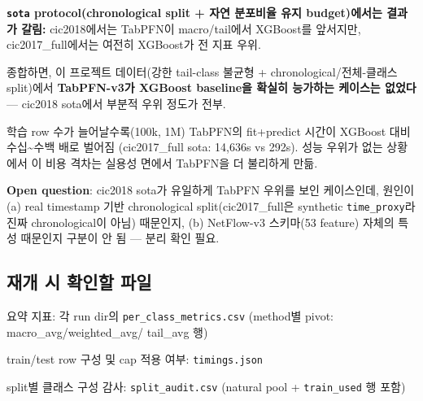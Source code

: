 \par\noindent \textbullet\enspace \textbf{\texttt{sota} protocol(chronological split +\allowbreak{} 자연 분포비율 유지 budget)에서는 결과가 갈림:} cic2018에서는 TabPFN이 macro/\allowbreak{}tail에서 XGBoost를 앞서지만, cic2017\_\allowbreak{}full에서는 여전히 XGBoost가 전 지표 우위.


\par\noindent \textbullet\enspace 종합하면, 이 프로젝트 데이터(강한 tail-class 불균형 +\allowbreak{} chronological/\allowbreak{}전체-클래스 split)에서 \textbf{TabPFN-v3가 XGBoost baseline을 확실히 능가하는 케이스는 없었다} — cic2018 sota에서 부분적 우위 정도가 전부.


\par\noindent \textbullet\enspace 학습 row 수가 늘어날수록(100k, 1M) TabPFN의 fit+\allowbreak{}predict 시간이 XGBoost 대비 수십\textasciitilde{}수백 배로 벌어짐 (cic2017\_\allowbreak{}full sota: 14,636s vs 292s). 성능 우위가 없는 상황에서 이 비용 격차는 실용성 면에서 TabPFN을 더 불리하게 만듦.


\par\noindent \textbullet\enspace \textbf{Open question}: cic2018 sota가 유일하게 TabPFN 우위를 보인 케이스인데, 원인이 (a) real timestamp 기반 chronological split(cic2017\_\allowbreak{}full은 synthetic \texttt{time\_\allowbreak{}\allowbreak{}pro\allowbreak{}xy}라 진짜 chronological이 아님) 때문인지, (b) NetFlow-v3 스키마(53 feature) 자체의 특성 때문인지 구분이 안 됨 — 분리 확인 필요.


\subsection{재개 시 확인할 파일}
\par\noindent \textbullet\enspace 요약 지표: 각 run dir의 \texttt{per\_\allowbreak{}\allowbreak{}clas\allowbreak{}s\_\allowbreak{}\allowbreak{}metric\allowbreak{}s.\allowbreak{}csv} (method별 pivot: macro\_\allowbreak{}avg/\allowbreak{}weighted\_\allowbreak{}avg/\allowbreak{} tail\_\allowbreak{}avg 행)


\par\noindent \textbullet\enspace train/\allowbreak{}test row 구성 및 cap 적용 여부: \texttt{timings.\allowbreak{}json}


\par\noindent \textbullet\enspace split별 클래스 구성 감사: \texttt{split\_\allowbreak{}\allowbreak{}au\allowbreak{}dit.\allowbreak{}csv} (natural pool +\allowbreak{} \texttt{train\_\allowbreak{}\allowbreak{}us\allowbreak{}ed} 행 포함)


